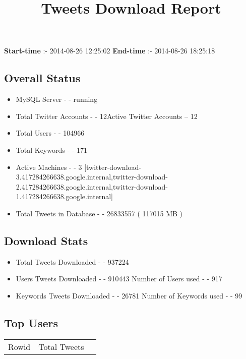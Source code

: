 \documentclass{article}\usepackage[T1]{fontenc}
\begin{document}
\title{\textbf{Tweets Download Report}}
               \date{}
                \maketitle
               \centerline{\textbf{Start-time} :- 2014-08-26 12:25:02 \hspace{40pt} \textbf{End-time} :- 2014-08-26 18:25:18}               \subsection*{Overall Status}                \begin{itemize}                \item MySQL Server - - running               \item Total Twitter Accounts - - 12\newline Active Twitter Accounts -- 12               \item Total Users - - 104966               \item Total Keywords - - 171               \item Active Machines - - 3 [twitter-download-3.417284266638.google.internal,twitter-download-2.417284266638.google.internal,twitter-download-1.417284266638.google.internal]               \item Total Tweets in Database - - 26833557 ( 117015 MB )               \end{itemize}               \subsection*{Download Stats}                \begin{itemize}                \item Total Tweets Downloaded - - 937224               \item Users Tweets Downloaded - - 910443 \newline Number of Users used - - 917               \item Keywords Tweets Downloaded - - 26781 \newline Number of Keywords used - - 99              \end{itemize}              \subsection*{Top Users}\begin{tabular}{|c|c|c|}         \hline         Rowid & Total Tweets \\ 

\end{tabular}
\end{document}
